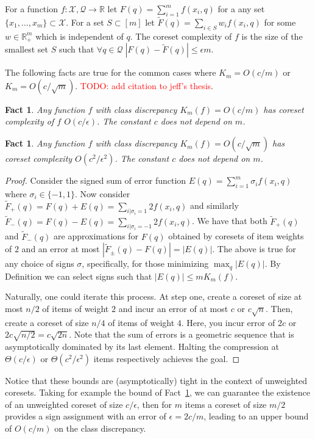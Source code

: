 \documentclass[anon,12pt]{colt2019} %
\newtheorem{fact}[theorem]{Fact}
\newcommand{\todo}[1]{\textcolor{red}{TODO: #1}}
\newcommand{\R}{\mathbb{R}}
\newcommand{\eps}{\epsilon}
\newcommand{\X}{\mathcal{X}}
\newcommand{\Q}{\mathcal{Q}}
\begin{document}
\begin{definition}  
For a function $f:\X,\Q\rightarrow \R$ let $F(q) = \sum_{i=1}^{m} f(x_i,q)$ for a any set $\{x_1,\ldots,x_m\} \subset \X$.
For a set $S \subset [m]$ let $\tilde F(q) = \sum_{i \in S}w_i f(x_i,q)$ for some $w\in\R_+^m$ which is independent of $q$.
The coreset complexity of $f$ is the size of the smallest set $S$ such that $\forall q \in \Q \; |F(q)  - \tilde F(q)| \le \eps m$.
\end{definition}
\noindent The following facts are true for the common cases where $K_m = O(c/m)$ or $K_m = O(c/\sqrt{m})$.
\todo{add citation to jeff's thesis}.
\begin{fact}\label{fct:eps1}
Any function $f$ with class discrepancy $K_m(f) = O(c/m)$ has coreset complexity of $f$ $O(c/\eps)$.
The constant $c$ does not depend on $m$.
\end{fact}
\begin{fact}\label{fct:eps2}
Any function $f$ with class discrepancy $K_m(f) = O(c/\sqrt{m})$ has coreset complexity $O(c^2/\eps^2)$.
The constant $c$ does not depend on $m$.
\end{fact}
\begin{proof}
\noindent  Consider the signed sum of error function $E(q) = \sum_{i=1}^{m} \sigma_i f(x_i,q)$ where $\sigma_i \in \{-1,1\}$.
Now consider $\tilde F_{+}(q) = F(q) + E(q)   = \sum_{i | \sigma_i=1} 2 f(x_i,q)$ and similarly $\tilde F_{-}(q) = F(q) - E(q)  =  \sum_{i | \sigma_i=-1} 2 f(x_i,q)$. We have that both $\tilde F_{+}(q)$ and $\tilde F_{-}(q)$ are approximations for $F(q)$ obtained by coresets of item weights of $2$ and an error at most $|\tilde F_{\pm}(q)- F(q)| =  |E(q)|$. The above is true for any choice of signs $\sigma$, specifically, for those minimizing $\max_q | E(q)|$.
By Definition we can select signs such that $|E(q)| \le m K_m(f)$.

Naturally, one could iterate this process.
At step one, create a coreset of size at most $n/2$ of items of weight $2$ and incur an error of at most $c$ or $c \sqrt{n}$.
Then, create a coreset of size $n/4$ of items of weight $4$. Here, you incur error of $2c$ or $2c\sqrt{n/2}  = c\sqrt{2n}$.
Note that the sum of errors is a geometric sequence that is asymptotically dominated by its last element. 
Halting the compression at $\Theta(c/\eps)$ or $\Theta(c^2/\eps^2)$ items respectively achieves the goal.
\end{proof}

Notice that these bounds are (asymptotically) tight in the context of unweighted coresets. Taking for example the bound of Fact~\ref{fct:eps1}, we can guarantee the existence of an unweighted coreset of size $c/\eps$, then for $m$ items a coreset of size $m/2$ provides a sign assignment with an error of $\eps=2c/m$, leading to an upper bound of $O(c/m)$ on the class discrepancy.
\end{document}
